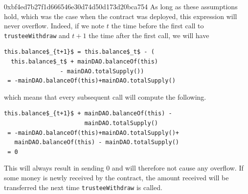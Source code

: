 \begin{investigation}{0xbf4ed7b27f1d666546e30d74d50d173d20bca754}
	As long as these assumptions hold, which was the case when the contract was deployed, this expression will never overflow. Indeed, if we note $t$ the time before the first call to \lstinline{trusteeWithdraw} and $t + 1$ the time after the first call, we will have
	\begin{lstlisting}
this.balance$_{t+1}$ = this.balance$_t$ - (
  this.balance$_t$ + mainDAO.balanceOf(this)
                - mainDAO.totalSupply())
 = -mainDAO.balanceOf(this)+mainDAO.totalSupply()
\end{lstlisting}


	which means that every subsequent call will compute the following.

	\begin{lstlisting}
this.balance$_{t+1}$ + mainDAO.balanceOf(this) -
                       mainDAO.totalSupply()
 = -mainDAO.balanceOf(this)+mainDAO.totalSupply()+
   mainDAO.balanceOf(this) - mainDAO.totalSupply()
 = 0
\end{lstlisting}


	This will always result in sending $0$ and will therefore not cause any overflow. If some money is newly received by the contract, the amount received will be transferred the next time \lstinline{trusteeWithdraw} is called.
\end{investigation}


